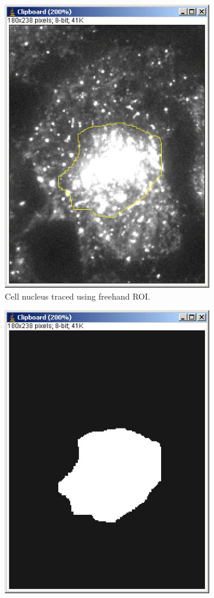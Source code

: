 \documentclass{article}
\begin{document}
\begin{figure}[!ht]
\begin{subfigure}{.5\textwidth}
  \centering
  \includegraphics[width=.8\linewidth]{img/cellnuctrace.jpg}
  \caption{Cell nucleus traced using freehand ROI.}
  \label{fig:nucTraced}
\end{subfigure}%
\begin{subfigure}{.5\textwidth}
  \centering
  \includegraphics[width=.8\linewidth]{img/cellnuctrace_bw.jpg}

\end{subfigure}
\end{figure}
\end{document}
